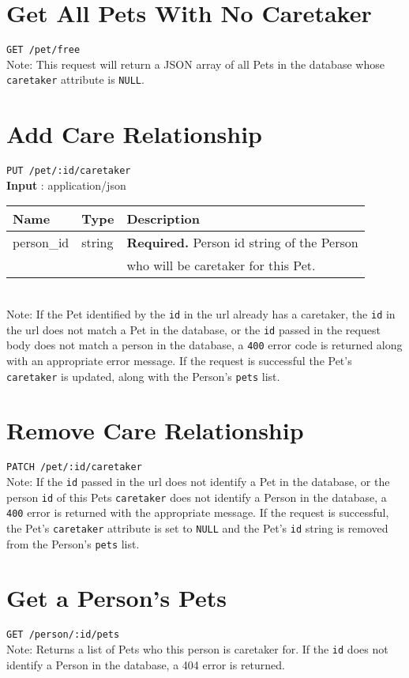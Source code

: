 \documentclass{article}
\begin{document}
\section*{Get All Pets With No Caretaker}
\texttt{GET /pet/free} \\
Note: This request will return a JSON array of all Pets in the database whose
\texttt{caretaker} attribute is \texttt{NULL}.

\section*{Add Care Relationship}
\texttt{PUT /pet/:id/caretaker} \\
\textbf{Input} : application/json \\
\begin{tabular}{| l | l | l |}
	\hline
	\textbf{Name} & \textbf{Type} & \textbf{Description} \\
	\hline
	person\_id   & string         & \textbf{Required.} Person id string of the Person \\
		     &                & who will be caretaker for this Pet. \\
	\hline
\end{tabular} \\
Note: If the Pet identified by the \texttt{id} in the url already has a caretaker,
the \texttt{id} in the url does not match a Pet in the database, or the \texttt{id}
passed in the request body does not match a person in the database, a \texttt{400} error code
is returned along with an appropriate error message. If the request is successful the Pet's
\texttt{caretaker} is updated, along with the Person's \texttt{pets} list.

\section*{Remove Care Relationship}
\texttt{PATCH /pet/:id/caretaker} \\
Note: If the \texttt{id} passed in the url does not identify a Pet in the database,
or the person \texttt{id} of this Pets \texttt{caretaker} does not identify a Person
in the database, a \texttt{400} error is returned with the appropriate message.
If the request is successful, the Pet's \texttt{caretaker} attribute is set to
\texttt{NULL} and the Pet's \texttt{id} string is removed from the Person's
\texttt{pets} list.

\section*{Get a Person's Pets}
\texttt{GET /person/:id/pets} \\
Note: Returns a list of Pets who this person is caretaker for. If the \texttt{id}
does not identify a Person in the database, a 404 error is returned.
\end{document}
